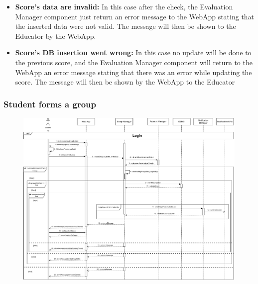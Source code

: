 \documentclass{article}
\begin{document}
{\begin{itemize}
            stating that the the procedure was denied. The message will be shown 
            by the WebApp to the Educator themselves and finally the User will 
            redirected to the login page (omitted for simplicity).
            \item \textbf{Score's data are invalid:} In this case after the check, 
            the Evaluation Manager component just return an error message to the 
            WebApp stating that the inserted data were not valid. The message will 
            then be shown to the Educator by the WebApp.
            \item \textbf{Score's DB insertion went wrong:} In this case no update will
            be done to the previous score, and the Evaluation Manager component 
            will return to the WebApp an error message stating that there was an 
            error while updating the score. The message will then be shown by the 
            WebApp to the Educator
        \end{itemize}


    \subsubsection{Student forms a group}
        \begin{figure}[H]
            \centering
            \hspace*{-3.1cm}\includegraphics[scale=0.6]{Sequence/Sequence9DD.pdf}
            \caption{}
            \label{fig:Sequence9DD}
        \end{figure}

}
\end{document}
